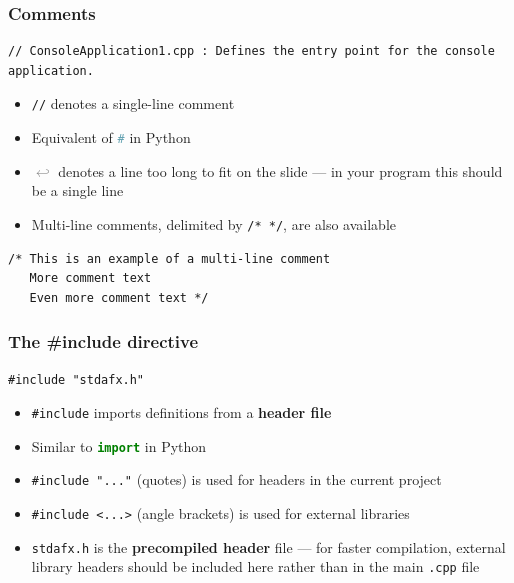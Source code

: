 \begin{frame}[fragile]
	\frametitle{Comments}
	\begin{lstlisting}
// ConsoleApplication1.cpp : Defines the entry point for the console application.
	\end{lstlisting}
	\pause
	\begin{itemize}
		\item \lstinline{//} denotes a single-line comment \pause
		\item Equivalent of \lstinline[language=Python]{#} in Python \pause
		\item \textcolor{Gray}{$\hookleftarrow$} denotes a line too long to fit on the slide ---
			in your program this should be a single line \pause
		\item Multi-line comments, delimited by \lstinline{/* */}, are also available
	\end{itemize}
	\begin{lstlisting}
/* This is an example of a multi-line comment
   More comment text
   Even more comment text */
	\end{lstlisting}
\end{frame}

\begin{frame}[fragile]
	\frametitle{The \#include directive}
	\begin{lstlisting}
#include "stdafx.h"
	\end{lstlisting}
	\pause
	\begin{itemize}
		\item \lstinline{#include} imports definitions from a \textbf{header file} \pause
		\item Similar to \lstinline[language=Python]{import} in Python \pause
		\item \lstinline{#include "..."} (quotes) is used for headers in the current project \pause
		\item \lstinline{#include <...>} (angle brackets) is used for external libraries \pause
		\item \texttt{stdafx.h} is the \textbf{precompiled header} file --- for faster compilation, external library headers should be included here rather than in the main \texttt{.cpp} file
	\end{itemize}
\end{frame}

